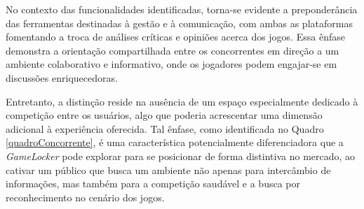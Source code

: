 No contexto das funcionalidades identificadas, torna-se evidente a preponderância das ferramentas destinadas à gestão e à comunicação, com ambas as plataformas fomentando a troca de análises críticas e opiniões acerca dos jogos. Essa ênfase demonstra a orientação compartilhada entre os concorrentes em direção a um ambiente colaborativo e informativo, onde os jogadores podem engajar-se em discussões enriquecedoras.

Entretanto, a distinção reside na ausência de um espaço especialmente dedicado à competição entre os usuários, algo que poderia acrescentar uma dimensão adicional à experiência oferecida. Tal ênfase, como identificada no Quadro \ref{quadroConcorrente}, é uma característica potencialmente diferenciadora que a \textit{GameLocker} pode explorar para se posicionar de forma distintiva no mercado, ao cativar um público que busca um ambiente não apenas para intercâmbio de informações, mas também para a competição saudável e a busca por reconhecimento no cenário dos jogos.